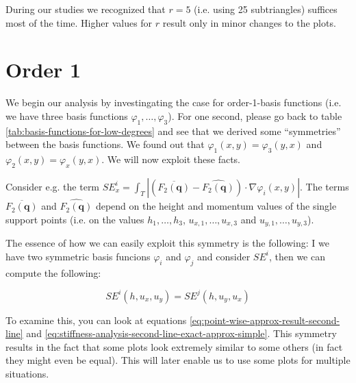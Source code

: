 \documentclass{article}
\renewcommand{\phi}{\varphi}
\begin{document}
During our studies we recognized that $r=5$ (i.e. using 25 subtriangles) suffices most of the time. Higher values for $r$ result only in minor changes to the plots.

\section{Order 1}
\label{sec:stiffness-analysis-first-touch}

We begin our analysis by investingating the case for order-1-basis functions (i.e. we have three basis functions $\phi_1,\dots,\phi_3$). For one second, please go back to table \ref{tab:basis-functions-for-low-degrees} and see that we derived some ``symmetries'' between the basis functions. We found out that $\phi_1(x,y)=\phi_3(y,x)$ and $\phi_2(x,y)=\phi_x(y,x)$. We will now exploit these facts.

Consider e.g. the term $SE_x^i = \int_T \left| \left(\overline{F_2(\mathbf{q})}-\widehat{F_2(\mathbf{q})}\right) \cdot \nabla\phi_i(x,y) \right|$. The terms $\overline{F_2(\mathbf{q})}$ and $\widehat{F_2(\mathbf{q})}$ depend on the height and momentum values of the single support points (i.e. on the values $h_1,\dots,h_3$, $u_{x,1},\dots,u_{x,3}$ and $u_{y,1},\dots,u_{y,3}$).

The essence of how we can easily exploit this symmetry is the following: I we have two symmetric basis funcions $\phi_i$ and $\phi_j$ and consider $SE^i$, then we can compute the following:

\begin{equation*}
  SE^i(h, u_x, u_y) = SE^j(h, u_y, u_x)
\end{equation*}

To examine this, you can look at equations \eqref{eq:point-wise-approx-result-second-line} and \eqref{eq:stiffness-analysis-second-line-exact-approx-simple}. This symmetry results in the fact that some plots look extremely similar to some others (in fact they might even be equal). This will later enable us to use some plots for multiple situations.

\end{document}
